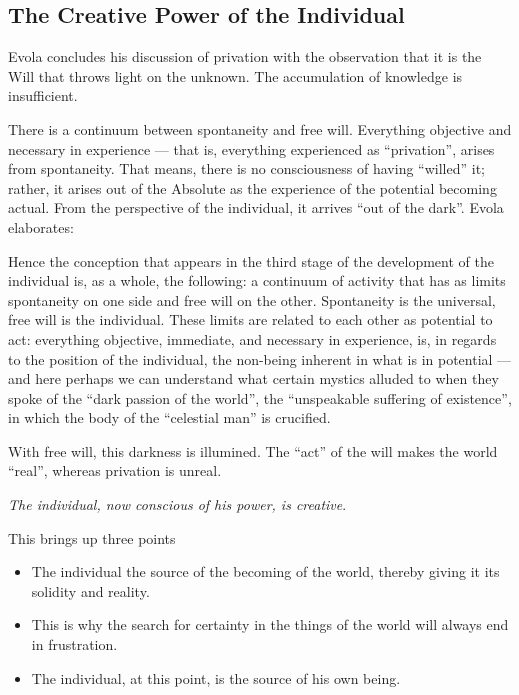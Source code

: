 \subsection*{The Creative Power of the Individual}

Evola concludes his discussion of privation with the observation that it is the Will that throws light on the unknown. The accumulation of knowledge is insufficient.

There is a continuum between spontaneity and free will. Everything objective and necessary in experience --- that is, everything experienced as ``privation'', arises from spontaneity. That means, there is no consciousness of having ``willed'' it; rather, it arises out of the Absolute as the experience of the potential becoming actual. From the perspective of the individual, it arrives ``out of the dark''. Evola elaborates:

\begin{quotex}
Hence the conception that appears in the third stage of the development of the individual is, as a whole, the following: a continuum of activity that has as limits spontaneity on one side and free will on the other. Spontaneity is the universal, free will is the individual. These limits are related to each other as potential to act: everything objective, immediate, and necessary in experience, is, in regards to the position of the individual, the non-being inherent in what is in potential --- and here perhaps we can understand what certain mystics alluded to when they spoke of the ``dark passion of the world'', the ``unspeakable suffering of existence'', in which the body of the ``celestial man'' is crucified.
\end{quotex}


With free will, this darkness is illumined. The ``act'' of the will makes the world ``real'', whereas privation is unreal.

\emph{The individual, now conscious of his power, is creative}.


This brings up three points

\begin{itemize}


\item The individual the source of the becoming of the world, thereby giving it its solidity and reality.

\item This is why the search for certainty in the things of the world will always end in frustration.

\item The individual, at this point, is the source of his own being.
\end{itemize}


